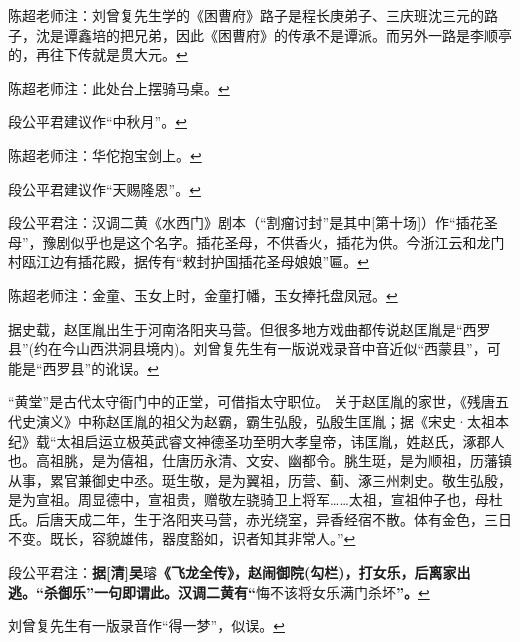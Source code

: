   陈超老师注：刘曾复先生学的《困曹府》路子是程长庚弟子、三庆班沈三元的路子，沈是谭鑫培的把兄弟，因此《困曹府》的传承不是谭派。而另外一路是李顺亭的，再往下传就是贯大元。\protect\hyperlink{fnref413}{↩}
\item
  \leavevmode\hypertarget{fn414}{}%
  陈超老师注：此处台上摆骑马桌。\protect\hyperlink{fnref414}{↩}
\item
  \leavevmode\hypertarget{fn415}{}%
  段公平君建议作``中秋月''。\protect\hyperlink{fnref415}{↩}
\item
  \leavevmode\hypertarget{fn416}{}%
  陈超老师注：华佗抱宝剑上。\protect\hyperlink{fnref416}{↩}
\item
  \leavevmode\hypertarget{fn417}{}%
  段公平君建议作``天赐隆恩''。\protect\hyperlink{fnref417}{↩}
\item
  \leavevmode\hypertarget{fn418}{}%
  段公平君注：汉调二黄《水西门》剧本（``割瘤讨封''是其中{[}第十场{]}）作``插花圣母''，豫剧似乎也是这个名字。插花圣母，不供香火，插花为供。今浙江云和龙门村瓯江边有插花殿，据传有``敕封护国插花圣母娘娘''匾。\protect\hyperlink{fnref418}{↩}
\item
  \leavevmode\hypertarget{fn419}{}%
  陈超老师注：金童、玉女上时，金童打幡，玉女捧托盘凤冠。\protect\hyperlink{fnref419}{↩}
\item
  \leavevmode\hypertarget{fn420}{}%
  据史载，赵匡胤出生于河南洛阳夹马营。但很多地方戏曲都传说赵匡胤是``西罗县''(约在今山西洪洞县境内)。刘曾复先生有一版说戏录音中音近似``西蒙县''，可能是``西罗县''的讹误。\protect\hyperlink{fnref420}{↩}
\item
  \leavevmode\hypertarget{fn421}{}%
  ``黄堂''是古代太守衙门中的正堂，可借指太守职位。
  关于赵匡胤的家世，《残唐五代史演义》中称赵匡胤的祖父为赵霸，霸生弘殷，弘殷生匡胤；据《宋史·太祖本纪》载``太祖启运立极英武睿文神德圣功至明大孝皇帝，讳匡胤，姓赵氏，涿郡人也。高祖朓，是为僖祖，仕唐历永清、文安、幽都令。朓生珽，是为顺祖，历藩镇从事，累官兼御史中丞。珽生敬，是为翼祖，历营、蓟、涿三州刺史。敬生弘殷，是为宣祖。周显德中，宣祖贵，赠敬左骁骑卫上将军\ldots{}\ldots{}太祖，宣祖仲子也，母杜氏。后唐天成二年，生于洛阳夹马营，赤光绕室，异香经宿不散。体有金色，三日不变。既长，容貌雄伟，器度豁如，识者知其非常人。''\protect\hyperlink{fnref421}{↩}
\item
  \leavevmode\hypertarget{fn422}{}%
  段公平君注：\textbf{据{[}清{]}吴}璿\textbf{《飞龙全传》，赵闹御院(勾栏)，打女乐，后离家出逃。``杀御乐''一句即谓此。汉调二黄有``}悔不该将女乐满门杀坏\textbf{''。}\protect\hyperlink{fnref422}{↩}
\item
  \leavevmode\hypertarget{fn423}{}%
  刘曾复先生有一版录音作``得一梦''，似误。\protect\hyperlink{fnref423}{↩}
